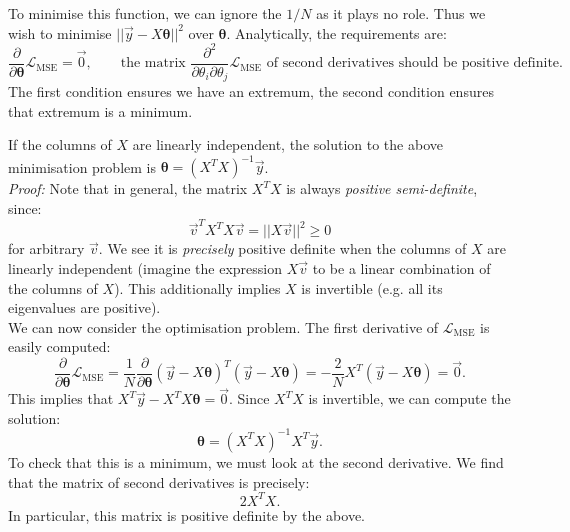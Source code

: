 To minimise this function, we can ignore the $1/N$ as it plays no role. Thus we wish to minimise $||\vec{y} - X\pmb{\theta}||^2$ over $\pmb{\theta}$. Analytically, the requirements are:
\begin{equation*}
\frac{\partial}{\partial \pmb{\theta}} \mathcal{L}_{\text{MSE}} = \vec{0}, \qquad \text{the matrix }\frac{\partial^2}{\partial \theta_i \partial \theta_j} \mathcal{L}_{\text{MSE}}\text{ of second derivatives should be positive definite.}
\end{equation*}
The first condition ensures we have an extremum, the second condition ensures that extremum is a minimum.

\begin{frameprop}
If the columns of $X$ are linearly independent, the solution to the above minimisation problem is $\pmb{\theta} = (X^TX)^{-1} \vec{y}$.\\

\textit{Proof:} Note that in general, the matrix $X^TX$ is always \textit{positive semi-definite}, since:
\begin{equation*}
\vec{v}^T X^T X\vec{v} = ||X\vec{v}||^2 \geq 0
\end{equation*}
for arbitrary $\vec{v}$. We see it is \textit{precisely} positive definite when the columns of $X$ are linearly independent (imagine the expression $X\vec{v}$ to be a linear combination of the columns of $X$). This additionally implies $X$ is invertible (e.g. all its eigenvalues are positive).\\

We can now consider the optimisation problem. The first derivative of $\mathcal{L}_{\text{MSE}}$ is easily computed:
\begin{equation*}
\frac{\partial}{\partial \pmb{\theta}} \mathcal{L}_{\text{MSE}} = \frac{1}{N}\frac{\partial}{\partial \pmb{\theta}} (\vec{y} - X \pmb{\theta})^T (\vec{y} - X\pmb{\theta}) = -\frac{2}{N}X^T (\vec{y} - X\pmb{\theta}) = \vec{0}.
\end{equation*}
This implies that $X^T \vec{y} - X^T X \pmb{\theta} = \vec{0}$. Since $X^TX$ is invertible, we can compute the solution:
\begin{equation*}
\pmb{\theta} = (X^T X)^{-1} X^T \vec{y}.
\end{equation*}
To check that this is a minimum, we must look at the second derivative. We find that the matrix of second derivatives is precisely:
\begin{equation*}
2X^TX.
\end{equation*}
In particular, this matrix is positive definite by the above. \qedsymbol
\end{frameprop}

